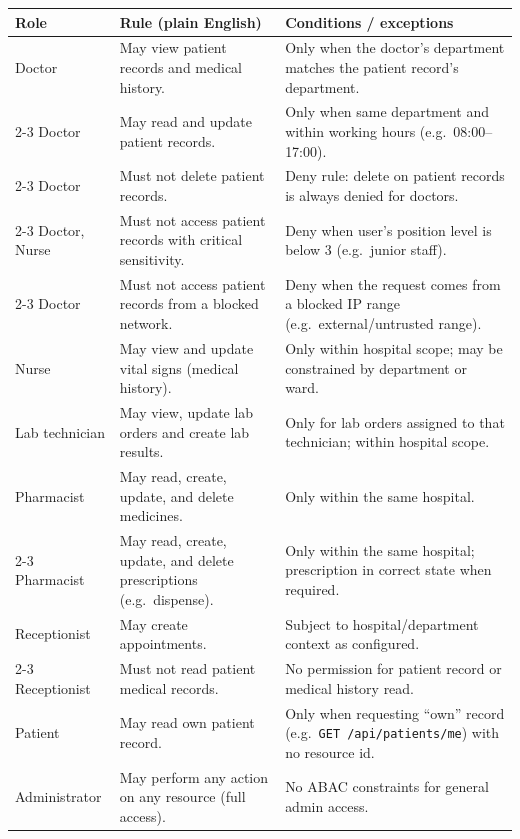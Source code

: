 \begin{table}[H]
\centering
\renewcommand{\arraystretch}{1.2}
\small
\begin{tabular}{|l|p{5.2cm}|p{5.8cm}|}
\hline
\textbf{Role} & \textbf{Rule (plain English)} & \textbf{Conditions / exceptions} \\
\hline
Doctor & May view patient records and medical history. & Only when the doctor's department matches the patient record's department. \\
\cline{2-3}
Doctor & May read and update patient records. & Only when same department and within working hours (e.g.\ 08:00--17:00). \\
\cline{2-3}
Doctor & Must not delete patient records. & Deny rule: delete on patient records is always denied for doctors. \\
\cline{2-3}
Doctor, Nurse & Must not access patient records with critical sensitivity. & Deny when user's position level is below 3 (e.g.\ junior staff). \\
\cline{2-3}
Doctor & Must not access patient records from a blocked network. & Deny when the request comes from a blocked IP range (e.g.\ external/untrusted range). \\
\hline
Nurse & May view and update vital signs (medical history). & Only within hospital scope; may be constrained by department or ward. \\
\hline
Lab technician & May view, update lab orders and create lab results. & Only for lab orders assigned to that technician; within hospital scope. \\
\hline
Pharmacist & May read, create, update, and delete medicines. & Only within the same hospital. \\
\cline{2-3}
Pharmacist & May read, create, update, and delete prescriptions (e.g.\ dispense). & Only within the same hospital; prescription in correct state when required. \\
\hline
Receptionist & May create appointments. & Subject to hospital/department context as configured. \\
\cline{2-3}
Receptionist & Must not read patient medical records. & No permission for patient record or medical history read. \\
\hline
Patient & May read own patient record. & Only when requesting ``own'' record (e.g.\ \texttt{GET /api/patients/me}) with no resource id. \\
\hline
Administrator & May perform any action on any resource (full access). & No ABAC constraints for general admin access. \\

\end{tabular}
\end{table}

